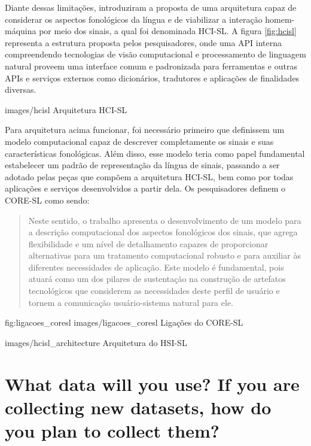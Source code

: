 Diante dessas limitações, \textcite{antunes-hcisl-2011} introduziram a proposta de uma arquitetura capaz de considerar os aspectos fonológicos da língua e de viabilizar a interação homem-máquina por meio dos sinais, a qual foi denominada HCI-SL. A figura \ref{fig:hcisl} representa a estrutura proposta pelos pesquisadores, onde uma API interna compreendendo tecnologias de visão computacional e processamento de linguagem natural proveem uma interface comum e padronizada para ferramentas e outras APIs e serviços externos como dicionários, tradutores e aplicações de finalidades diversas.

    {images/hcisl}
    {Arquitetura HCI-SL \cite{antunes-hcisl-2011}}

Para arquitetura acima funcionar, foi necessário primeiro que \textcite{antunes-hcisl-2011} definissem um modelo computacional capaz de descrever completamente os sinais e suas características fonológicas. Além disso, esse modelo teria como papel fundamental estabelecer um padrão de representação da língua de sinais, passando a ser adotado pelas peças que compõem a arquitetura HCI-SL, bem como por todas aplicações e serviços desenvolvidos a partir dela. Os pesquisadores definem o CORE-SL como sendo:

\begin{quote}
Neste sentido, o trabalho apresenta o desenvolvimento de um modelo para a descrição computacional dos aspectos fonológicos dos sinais, que agrega flexibilidade e um nível de detalhamento capazes de proporcionar alternativas para um tratamento computacional robusto e para auxiliar às diferentes necessidades de aplicação. Este modelo é fundamental, pois atuará como um dos pilares de sustentação na construção de artefatos tecnológicos que considerem as necessidades deste perfil de usuário e tornem a comunicação usuário-sistema natural para ele. \cite{antunes-2011}
\end{quote}

\image
    {fig:ligacoes_coresl}
    {images/ligacoes_coresl}
    {Ligações do CORE-SL}




    {images/hcisl_architecture}
    {Arquitetura do HSI-SL}


\section{What data will you use? If you are collecting new datasets, how do you plan to collect
them?}

